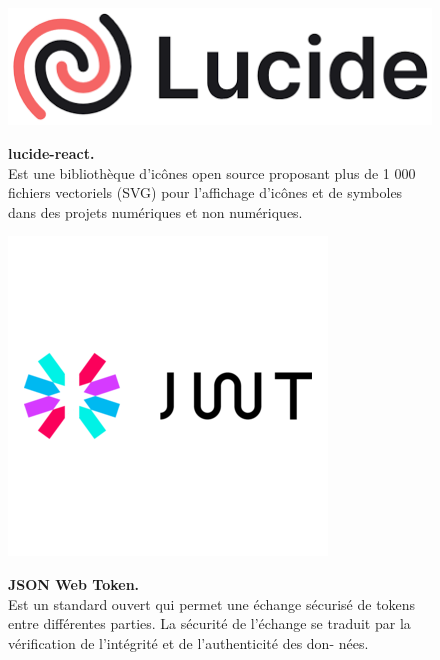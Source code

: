 \begin{figure}[H]
    \centering
    \begin{minipage}[c]{0.3\textwidth}
        \includegraphics[width=\linewidth]{projet/images/diagramme de sequance/images/lucide-react.png}
    \end{minipage}
    \hspace{1cm}
    \begin{minipage}[c]{0.6\textwidth}
        \textbf{lucide-react.}\\[0.5em]
    Est  une bibliothèque d'icônes open source proposant plus de 1 000 fichiers vectoriels (SVG) pour l'affichage d'icônes et de symboles dans des projets numériques et non numériques. \cite{ref22}
    \end{minipage}
\end{figure}
\vspace{0.5cm}
\begin{figure}[H]
    \centering
    \begin{minipage}[c]{0.3\textwidth}
        \includegraphics[width=\linewidth]{projet/images/diagramme de sequance/images/jwt.png}
    \end{minipage}
    \hspace{1cm}
    \begin{minipage}[c]{0.6\textwidth}
        \textbf{JSON Web Token.}\\[0.5em]
    Est un standard ouvert qui permet une échange sécurisé de tokens entre différentes parties. La sécurité de l’échange
se traduit par la vérification de l’intégrité et de l’authenticité des don-
nées. \cite{ref23}
    \end{minipage}
\end{figure}
